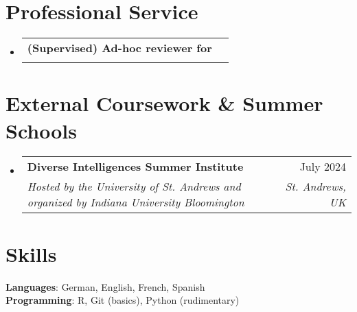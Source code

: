 \documentclass[letterpaper,11pt]{article}
\makeatletter
\newcommand{\resumeSubheading}[4]{
  \vspace{1pt}\item
    \begin{tabular*}{0.97\textwidth}[t]{l@{\extracolsep{\fill}}r}
      \textbf{#1} & #2 \\
      \textit{\small#3} & \textit{\small #4} \\
    \end{tabular*}\vspace{-7pt}
}
\newcommand{\resumeSubHeadingListStart}{\begin{itemize}[leftmargin=0.15in, label={}]}
\newcommand{\resumeSubHeadingListEnd}{\end{itemize}}
\makeatother
\begin{document}
\section{Professional Service}
\resumeSubHeadingListStart

\resumeSubheading
  {(Supervised) Ad-hoc reviewer for}{}  
  {\parbox[t]{0.9\textwidth}{Nature Climate Change (1), Public Understanding of Science (1), PNAS Nexus (1), Social Science \& Medicine (1), Društvena istraživanja (Croatian social science review) (1)}}{}

\resumeSubHeadingListEnd

\section{External Coursework \& Summer Schools}
  \resumeSubHeadingListStart

    \resumeSubheading
      {Diverse Intelligences Summer Institute}{July 2024}
      {Hosted by the University of St. Andrews and organized by Indiana University Bloomington
}{St. Andrews, UK}

  \resumeSubHeadingListEnd

\section{Skills}
 \begin{itemize}[leftmargin=0.15in, label={}]
    \small{\item{
     \textbf{Languages}{: German, English, French, Spanish} \\
     \textbf{Programming}{: R, Git (basics), Python (rudimentary)} \\
    }}
 \end{itemize}

\end{document}

